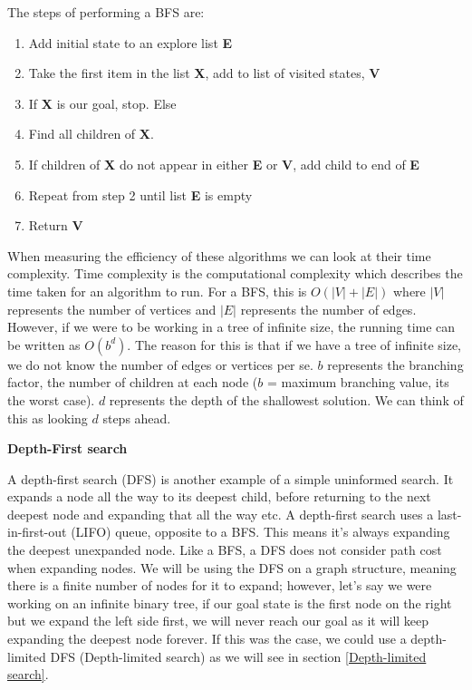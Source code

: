 \documentclass[]{final_report}
\begin{document}
\begin{minipage}[!htp]{0.5\linewidth}
The steps of performing a BFS are:\\
\begin{enumerate}
    \item Add initial state to an explore list \textbf{E}
    \item Take the first item in the list \textbf{X}, add to list of visited states, \textbf{V}
    \item If \textbf{X} is our goal, stop. Else
    \item Find all children of \textbf{X}.
    \item If children of \textbf{X} do not appear in either \textbf{E} or \textbf{V}, add child to end of \textbf{E}
    \item Repeat from step 2 until list \textbf{E} is empty
    \item Return \textbf{V}
\end{enumerate}
\end{minipage}\hfill
{}


When measuring the efficiency of these algorithms we can look at their time complexity. Time complexity is the computational complexity which describes the time taken for an algorithm to run. For a BFS, this is $O(|V| + |E|)$ where $|V|$ represents the number of vertices and $|E|$ represents the number of edges. However, if we were to be working in a tree of infinite size, the running time can be written as $O(b^d)$. The reason for this is that if we have a tree of infinite size, we do not know the number of edges or vertices per se. $b$ represents the branching factor, the number of children at each node ($b$ = maximum branching value, its the worst case). $d$ represents the depth of the shallowest solution. We can think of this as looking $d$ steps ahead.

\textbf{Depth-First search} 

A depth-first search (DFS) is another example of a simple uninformed search. It expands a node all the way to its deepest child, before returning to the next deepest node and expanding that all the way etc. A depth-first search uses a last-in-first-out (LIFO) queue, opposite to a BFS. This means it's always expanding the deepest unexpanded node. Like a BFS, a DFS does not consider path cost when expanding nodes. We will be using the DFS on a graph structure, meaning there is a finite number of nodes for it to expand; however, let's say we were working on an infinite binary tree, if our goal state is the first node on the right but we expand the left side first, we will never reach our goal as it will keep expanding the deepest node forever. If this was the case, we could use a depth-limited DFS (Depth-limited search) as we will see in section \ref{Depth-limited search}.
\end{document}
